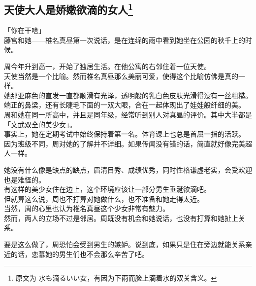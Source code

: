 \subsection[天使大人是娇嫩欲滴的女人]{天使大人是娇嫩欲滴的女人\footnote{原文为 {\jpfont 水も滴るいい女}，有因为下雨而脸上滴着水的双关含义。}}

「你在干啥」\\

藤宫和她——椎名真昼第一次说话，是在连绵的雨中看到她坐在公园的秋千上的时候。\\

\vspace{2\baselineskip}

周今年升到高一，开始了独居生活。在他公寓的右邻住着一位天使。\\

天使当然是一个比喻。然而椎名真昼那么美丽可爱，使得这个比喻仿佛是真的一样。\\

她那亚麻色的直发一直都顺滑有光泽，透明般的乳白色皮肤光滑得没有一丝粗糙。端正的鼻梁，还有长睫毛下面的一双大眼，合在一起体现出了娃娃般纤细的美。\\

周和她在同一所高中，并且是同年级，经常听到别人对真昼的评价。其中大半都是「文武双全的美少女」。\\

事实上，她在定期考试中始终保持着第一名。体育课上也总是首屈一指的活跃。\\

因为班级不同，周对她的了解并不详细。如果传闻没有错的话，简直就好像完美超人一样。

她没有什么像是缺点的缺点，眉清目秀、成绩优秀，同时性格谦虚老实，会受欢迎也是难怪的。\\

有这样的美少女住在边上，这个环境应该让一部分男生垂涎欲滴吧。\\

但就算这么说，周也不打算对她做什么，也不准备和她走得太近。\\

当然，周的心里也认为椎名真昼这个少女非常有魅力。\\

然而，两人的立场不过是邻居。周既没有机会和她说话，也没有打算和她扯上关系。

要是这么做了，周恐怕会受到男生的嫉妒。说到底，如果只是住在旁边就能关系亲近的话，恋慕她的男生们也不会那么辛苦了吧。\\

